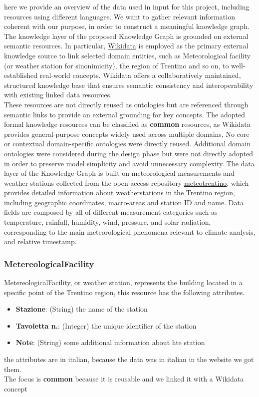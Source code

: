 here we provide an overview of the data used in input for this project, including resources using different languages. We want to gather relevant information coherent with our purpose, in order to construct a meaningful knowledge graph. The knowledge layer of the proposed Knowledge Graph is grounded on external semantic resources. In particular,
\href{https://www.wikidata.org/wiki/Wikidata:Main_Page}{Wikidata} is employed as the primary external knowledge source to link selected domain entities, such as Meteorological facility
(or weather station for sinonimicity), the region of Trentino and so on, to well-established real-world concepts.
Wikidata offers a collaboratively maintained, structured knowledge base that ensures semantic consistency and
interoperability with existing linked data resources.\\
These resources are not directly reused as ontologies but are referenced through semantic links to provide an external
grounding for key concepts.
The adopted formal knowledge resources can be classified as \textbf{common} resources, as Wikidata provides general-purpose
concepts widely used across multiple domains, No core or contextual domain-specific ontologies were directly reused.
Additional domain ontologies were considered during the design phase but were not directly adopted in order to preserve
model simplicity and avoid unnecessary complexity. The data layer of the Knowledge Graph is built on meteorological measurements and weather stations collected from the
open-access repository \href{http://storico.meteotrentino.it/web.htm}{meteotrentino}, which provides detailed information about weatherstations in the Trentino region, including geographic coordinates, macro-areas and station ID and name.
Data fields are composed by all of different measurement categories such as temperature, rainfall, humidity, wind, pressure, and solar radiation, corresponding to the main meteorological phenomena relevant to climate analysis, and relative timestamp.  
\subsubsection{MetereologicalFacility}
MetereologicalFacility, or weather station, represents the building located in a specific point of the Trentino region, this resource has the following attributes.
\begin{itemize}
    \item \textbf{Stazione}: (String) the name of the station
    \item \textbf{Tavoletta n.}: (Integer) the unique identifier of the station
    \item \textbf{Note}: (String) some additional information about hte station
\end{itemize}
the attributes are in italian, because the data was in italian in the website we got them.\\
The focus is \textbf{common} because it is reusable and we linked it with a Wikidata concept
